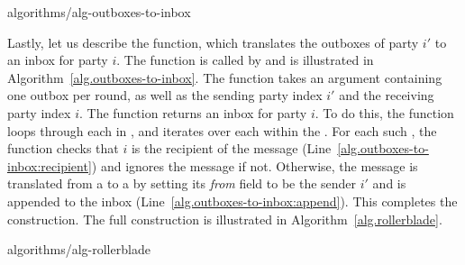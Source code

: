 {algorithms/alg-outboxes-to-inbox}

Lastly, let us describe the \outboxesToInbox function, which translates the outboxes
of party $i'$ to an inbox for party $i$. The function is called by \prepareSimulationInputs
and is illustrated in Algorithm~\ref{alg.outboxes-to-inbox}. The function takes an
\outboxes argument containing one outbox per round, as well as the sending party index
$i'$ and the receiving party index $i$. The function returns an inbox for party $i$.
To do this, the function loops through each \outbox in \outboxes, and iterates over each
\netin within the \outbox. For each such \netout, the function checks that $i$ is the
recipient of the message (Line~\ref{alg.outboxes-to-inbox:recipient}) and ignores the
message if not. Otherwise, the message is translated from a \netout to a \netin
by setting its \emph{from} field to be the sender $i'$ and is
appended to the inbox (Line~\ref{alg.outboxes-to-inbox:append}).
This completes the construction. The full construction is illustrated in
Algorithm~\ref{alg.rollerblade}.

{algorithms/alg-rollerblade}

